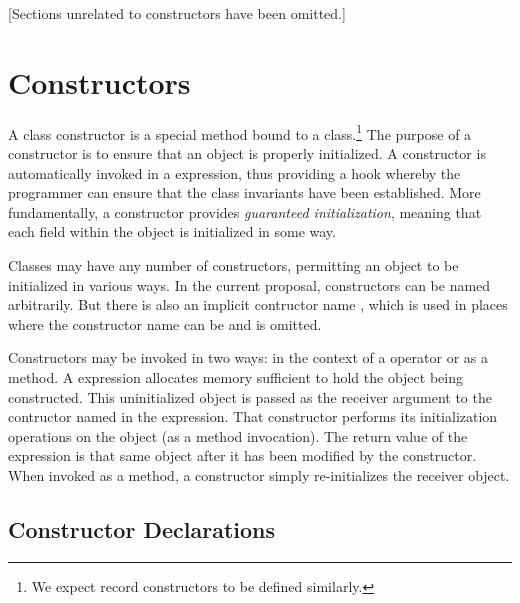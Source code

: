 

\label{Classes}

[Sections unrelated to constructors have been omitted.]

\section{Constructors}
\label{Constructors}

A class constructor is a special method bound to a class.\footnote{We expect
record constructors to be defined similarly.}  The purpose of a constructor is
to ensure that an object is properly initialized.  A constructor is
automatically invoked in a  expression, thus providing a hook whereby
the programmer can ensure that the class invariants have been established.
More fundamentally, a constructor provides \emph{guaranteed
initialization}, meaning that each field within the object is initialized in
some way.  

Classes may have any number of constructors, permitting an object to be
initialized in various ways.  In the current proposal, constructors can be named
arbitrarily.  But there is also an implicit contructor name ,
which is used in places where the constructor name can be and is omitted.

Constructors may be invoked in two ways: in the context of a  operator or as
a method.  A  expression allocates memory sufficient to hold the
object being constructed.  This uninitialized object is passed as the receiver
argument to the contructor named in the  expression.  That constructor
performs its initialization operations on the object (as a method invocation).
The return value of the  expression is that same object after it has
been modified by the constructor.  When invoked as a method, a constructor
simply re-initializes the receiver object.

\subsection{Constructor Declarations}
\label{Constructor_Declarations}

